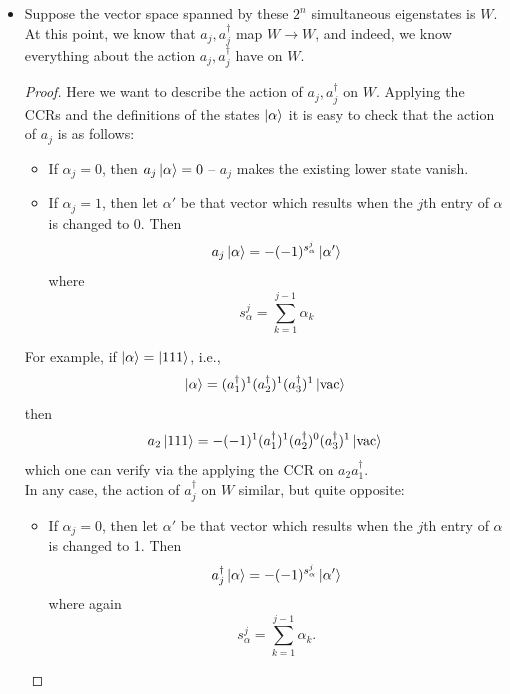 \documentclass{book}
\theoremstyle{definition}
\newcommand{\al}{\alpha}
\begin{document}
\begin{itemize}
	\item Suppose the vector space spanned by these $2^n$ simultaneous eigenstates is $W$. At this point, we know that $a_j ,a_j^\dagger$ map $W\to W$, and indeed, we know everything about the action $a_j, a_j^\dagger$ have on $W$. 
	
	
	\begin{proof}
		Here we want to describe the action of $a_j,a_j^\dagger$ on $W$. Applying the CCRs and the definitions of the states $\ket{\al}$ it is easy to check that the action of $a_j$ is as follows:
		\begin{itemize}
			\item If $\al_j = 0$, then $a_j \ket{\al} = 0$ -- $a_j$ makes the existing lower state vanish.
			
			\item If $\al_j = 1$, then let $\al'$ be that vector which results when the $j$th entry of $\al$ is changed to 0. Then 
			\begin{equation}
			a_j \ket{\al} = -(-1)^{s_\al^j} \ket{\al'}
			\end{equation}
			where
			\begin{equation}
			s_\al^j = \sum^{j-1}_{k=1}\al_k
			\end{equation}
		\end{itemize}
	For example, if $\ket{\al} = \ket{111}$, i.e., 
	\begin{equation}
	\ket{\al}= (a_1^\dagger)^1 (a_2^\dagger)^1 (a_3^\dagger)^1\ket{\text{vac}}
	\end{equation}
	then 
	\begin{equation}
	a_2\ket{111} = -(-1)^{1} (a_1^\dagger)^1(a_2^\dagger)^0 (a_3^\dagger)^1 \ket{\text{vac}}
	\end{equation}
	which one can verify via the applying the CCR on $a_2a_1^\dagger$.\\
	
	
	In any case, the action of $a_j^\dagger$ on $W$ similar, but quite opposite:
	\begin{itemize}
		\item If $\al_j = 0$, then let $\al'$ be that vector which results when the $j$th entry of $\al$ is changed to 1. Then 
		\begin{equation}
		a_j^\dagger \ket{\al} = -(-1)^{s_\al^j} \ket{\al'}
		\end{equation}
		where again
		\begin{equation}
		s_\al^j = \sum^{j-1}_{k=1} \al_k.
		\end{equation}
		

\end{itemize}
\end{proof}
\end{itemize}
\end{document}
